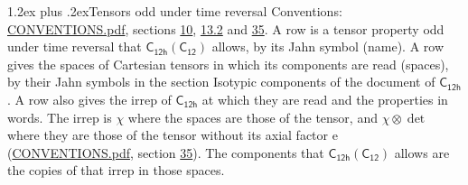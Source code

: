 \documentclass[10pt,a4paper]{article}
\makeatletter
\renewcommand\section{\@startsection{section}{1}{\z@}{-3ex plus -1ex minus -.2ex}%
  {1.2ex plus .2ex}{\normalfont\large\sffamily\bfseries\color{parttitle}}}
\numberwithin{equation}{section}
\newcommand{\grp}[1]{\mathsf{#1}}
\newcommand{\irrprod}{\otimes}
\makeatother
\begin{document}
\section{Tensors odd under time reversal}\label{s:time_odd}
Conventions: \href{../../CONVENTIONS.pdf}{CONVENTIONS.pdf}, sections \href{../../../rotation/CONVENTIONS.pdf\#conv.10}{10}, \href{../../../rotation/CONVENTIONS.pdf\#conv.13.2}{13.2} and \href{../../CONVENTIONS.pdf\#conv.35}{35}.
\leavevmode\label{n:head.name.property}A row is a tensor property odd under time reversal that $\grp{C_{12h}}(\grp{C_{12}})$ allows, by its Jahn symbol (name). \label{n:head.spaces}A row gives the spaces of Cartesian tensors in which its components are read (spaces), by their Jahn symbols in the section Isotypic components of the document of \href{../../../rotation/data/pdf/C12h.pdf}{$\grp{C_{12h}}$}. \label{n:head.properties}A row also gives the irrep of $\grp{C_{12h}}$ at which they are read and the properties in words. The irrep is $\chi$ where the spaces are those of the tensor, and $\chi \irrprod \det$ where they are those of the tensor without its axial factor e (\href{../../CONVENTIONS.pdf}{CONVENTIONS.pdf}, section \href{../../CONVENTIONS.pdf\#conv.35}{35}). The components that $\grp{C_{12h}}(\grp{C_{12}})$ allows are the copies of that irrep in those spaces.
\end{document}
